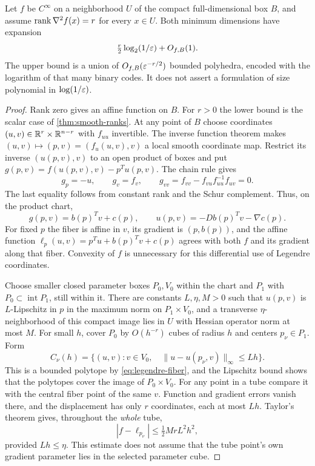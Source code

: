 \begin{theorem}\label{thm:constant-rank}
Let $f$ be $C^\infty$ on a neighborhood $U$ of the compact
full-dimensional box $B$, and assume $\operatorname{rank}\nabla^2f(x)=r$ for every
$x\in U$. Both minimum dimensions have expansion
\[
 \tfrac r2\log_2(1/\varepsilon)+O_{f,B}(1).
\]
The upper bound is a union of $O_{f,B}(\varepsilon^{-r/2})$ bounded polyhedra,
encoded with the logarithm of that many binary codes. It does not
assert a formulation of size polynomial in $\log(1/\varepsilon)$.
\end{theorem}
\begin{proof}
Rank zero gives an affine function on $B$. For $r>0$ the lower bound
is the scalar case of \cref{thm:smooth-ranks}. At any point of $B$
choose coordinates $(u,v)\in\mathbb R^r\times\mathbb R^{n-r}$ with $f_{uu}$
invertible. The inverse function theorem makes
$(u,v)\mapsto(p,v)=(f_u(u,v),v)$ a local smooth coordinate map.
Restrict its inverse $(u(p,v),v)$ to an open product of boxes and put
$g(p,v)=f(u(p,v),v)-p^Tu(p,v)$. The chain rule gives
\[
 g_p=-u,\qquad g_v=f_v,\qquad
 g_{vv}=f_{vv}-f_{vu}f_{uu}^{-1}f_{uv}=0.
\]
The last equality follows from constant rank and the Schur complement.
Thus, on the product chart,
\begin{equation}\label{eq:legendre-fiber}
 g(p,v)=b(p)^Tv+c(p),\qquad
 u(p,v)=-Db(p)^Tv-\nabla c(p).
\end{equation}
For fixed $p$ the fiber is affine in $v$, its gradient is
$(p,b(p))$, and the affine function
$\ell_p(u,v)=p^Tu+b(p)^Tv+c(p)$ agrees with both $f$ and its gradient
along that fiber. Convexity of $f$ is unnecessary for this differential
use of Legendre coordinates.

Choose smaller closed parameter boxes $P_0,V_0$ within the chart and
$P_1$ with $P_0\subset\operatorname{int}P_1$, still within it.
There are constants $L,\eta,M>0$ such that $u(p,v)$ is $L$-Lipschitz
in $p$ in the maximum norm on $P_1\times V_0$, and a transverse
$\eta$-neighborhood of this compact image lies in $U$ with Hessian
operator norm at most $M$. For small $h$, cover $P_0$ by
$O(h^{-r})$ cubes of radius $h$ and centers $p_\nu\in P_1$. Form
\[
 C_\nu(h)=\{(u,v):v\in V_0,\quad
                  \|u-u(p_\nu,v)\|_\infty\le Lh\}.
\]
This is a bounded polytope by \eqref{eq:legendre-fiber}, and the
Lipschitz bound shows that the polytopes cover the image of
$P_0\times V_0$. For any point in a tube compare it with the central
fiber point of the same $v$. Function and gradient errors vanish there,
and the displacement has only $r$ coordinates, each at most $Lh$.
Taylor's theorem gives, throughout the \emph{whole} tube,
\[
 |f-\ell_{p_\nu}|\le\tfrac12MrL^2h^2,
\]
provided $Lh\le\eta$. This estimate does not assume that the tube
point's own gradient parameter lies in the selected parameter cube.


\end{proof}
